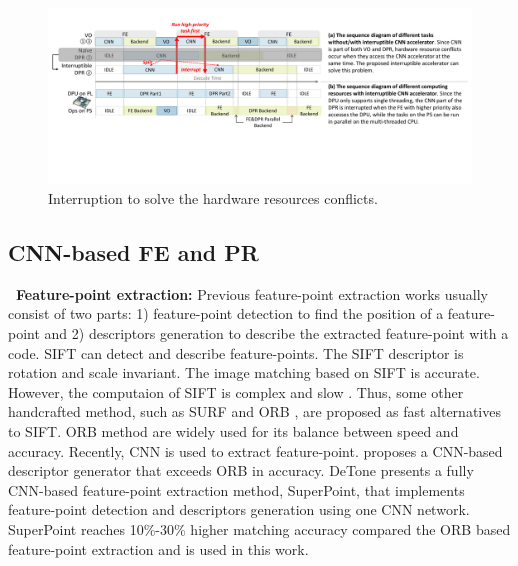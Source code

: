 
\label{sec:relate}


\begin{figure}[t]
	\centering
	\includegraphics[width=0.99\linewidth]{fig/interDPR.pdf}
    \caption{Interruption to solve the hardware resources conflicts.  
    }
	\label{fig:interDPR}
\end{figure}


\subsection{ CNN-based FE and PR }

\textbf{\quad \ Feature-point extraction:} Previous feature-point extraction works usually consist of two parts: 1) feature-point detection to find the position of a feature-point and 2) descriptors generation to describe the extracted feature-point with a code.
SIFT \cite{lowe2004distinctive} can detect and describe feature-points. The SIFT descriptor is rotation and scale invariant. The image matching based on SIFT is accurate. However, the computaion of SIFT is complex and slow \cite{bay2006surf}. Thus, some other handcrafted method, such as SURF\cite{bay2006surf} and ORB \cite{Mur-Artal:2017281}, are proposed as fast alternatives to SIFT. ORB \cite{Mur-Artal:2017281} method are widely used for its balance between speed and accuracy.
Recently, CNN is used to extract feature-point. \cite{simo2015discriminative} proposes a CNN-based descriptor generator that exceeds ORB in accuracy.
DeTone \cite{detone2018superpoint} presents a fully CNN-based feature-point extraction method, SuperPoint, that implements feature-point detection and descriptors generation using one CNN network. SuperPoint\cite{detone2018superpoint} reaches 10\%-30\% higher matching accuracy compared the ORB based feature-point extraction \cite{Mur-Artal:2017281} and is used in this work.

